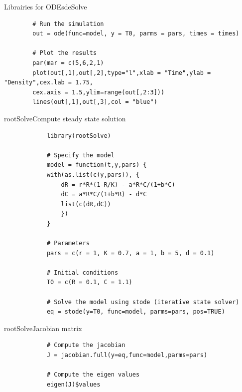 \documentclass{eecslides}
\begin{document}

	\begin{frame}[fragile]{Librairies for ODEs}{deSolve}

		\begin{lstlisting}
		# Run the simulation
		out = ode(func=model, y = T0, parms = pars, times = times)

		# Plot the results
		par(mar = c(5,6,2,1)
		plot(out[,1],out[,2],type="l",xlab = "Time",ylab = "Density",cex.lab = 1.75, 
		cex.axis = 1.5,ylim=range(out[,2:3]))  
		lines(out[,1],out[,3],col = "blue")  

		\end{lstlisting}
	\end{frame}


	\begin{frame}[fragile]{rootSolve}{Compute steady state solution}
		\begin{lstlisting}
			library(rootSolve)
	
			# Specify the model
			model = function(t,y,pars) {
			with(as.list(c(y,pars)), {
				dR = r*R*(1-R/K) - a*R*C/(1+b*C)
				dC = a*R*C/(1+b*R) - d*C 		
				list(c(dR,dC))
				})
			}

			# Parameters
			pars = c(r = 1, K = 0.7, a = 1, b = 5, d = 0.1)	

			# Initial conditions
			T0 = c(R = 0.1, C = 1.1)
 	
			# Solve the model using stode (iterative state solver)
			eq = stode(y=T0, func=model, parms=pars, pos=TRUE)
		\end{lstlisting}

	\end{frame}


	\begin{frame}[fragile]{rootSolve}{Jacobian matrix}
		\begin{lstlisting}
			# Compute the jacobian
			J = jacobian.full(y=eq,func=model,parms=pars)
		
			# Compute the eigen values
			eigen(J)$values
		\end{lstlisting}
	\end{frame}

\end{document}
